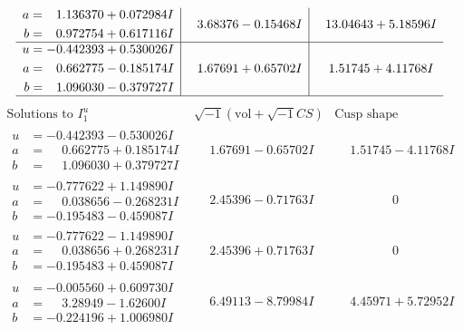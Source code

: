 \documentclass[1p]{elsarticle_modified}
\theoremstyle{definition}
\newcommand{\I}{\sqrt{-1}}
\begin{document}
$$\begin{array}{c|c|c}
\begin{aligned}
a &= \phantom{-}1.136370 + 0.072984 I \\
b &= \phantom{-}0.972754 + 0.617116 I\end{aligned}
 & \phantom{-}3.68376 - 0.15468 I & \phantom{-}13.04643 + 5.18596 I \\ \hline\begin{aligned}
u &= -0.442393 + 0.530026 I \\
a &= \phantom{-}0.662775 - 0.185174 I \\
b &= \phantom{-}1.096030 - 0.379727 I\end{aligned}
 & \phantom{-}1.67691 + 0.65702 I & \phantom{-}1.51745 + 4.11768 I\\
 \hline 
 \end{array}$$\newpage$$\begin{array}{c|c|c}  
\text{Solutions to }I^u_{1}& \I (\text{vol} + \sqrt{-1}CS) & \text{Cusp shape}\\
 \hline 
\begin{aligned}
u &= -0.442393 - 0.530026 I \\
a &= \phantom{-}0.662775 + 0.185174 I \\
b &= \phantom{-}1.096030 + 0.379727 I\end{aligned}
 & \phantom{-}1.67691 - 0.65702 I & \phantom{-}1.51745 - 4.11768 I \\ \hline\begin{aligned}
u &= -0.777622 + 1.149890 I \\
a &= \phantom{-}0.038656 - 0.268231 I \\
b &= -0.195483 - 0.459087 I\end{aligned}
 & \phantom{-}2.45396 - 0.71763 I & \phantom{-0.000000 } 0 \\ \hline\begin{aligned}
u &= -0.777622 - 1.149890 I \\
a &= \phantom{-}0.038656 + 0.268231 I \\
b &= -0.195483 + 0.459087 I\end{aligned}
 & \phantom{-}2.45396 + 0.71763 I & \phantom{-0.000000 } 0 \\ \hline\begin{aligned}
u &= -0.005560 + 0.609730 I \\
a &= \phantom{-}3.28949 - 1.62600 I \\
b &= -0.224196 + 1.006980 I\end{aligned}
 & \phantom{-}6.49113 - 8.79984 I & \phantom{-}4.45971 + 5.72952 I \\ \hline\begin{aligned}

\end{aligned}
\end{array}$$
\end{document}
